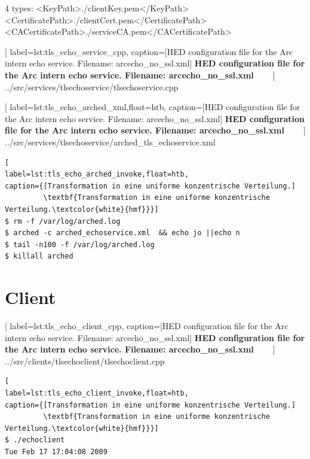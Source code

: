 4 types:
                <KeyPath>./clientKey.pem</KeyPath>
                <CertificatePath>./clientCert.pem</CertificatePath>
                <CACertificatePath>./serviceCA.pem</CACertificatePath>


	[
	label=lst:tls_echo_service_cpp,
	caption={[HED configuration file for the Arc intern echo service. Filename: arcecho\_no\_ssl.xml]
	\textbf{HED configuration file for the Arc intern echo service. Filename: arcecho\_no\_ssl.xml\textcolor{white}{hmf}}}
	]
{../src/services/tlsechoservice/tlsechoservice.cpp}





	[
	label=lst:tls_echo_arched_xml,float=htb,
	caption={[HED configuration file for the Arc intern echo service. Filename: arcecho\_no\_ssl.xml]
	\textbf{HED configuration file for the Arc intern echo service. Filename: arcecho\_no\_ssl.xml\textcolor{white}{hmf}}}
	]
{../src/services/tlsechoservice/arched_tls_echoservice.xml}


\begin{lstlisting}[
label=lst:tls_echo_arched_invoke,float=htb,
caption={[Transformation in eine uniforme konzentrische Verteilung.]
         \textbf{Transformation in eine uniforme konzentrische Verteilung.\textcolor{white}{hmf}}}]
$ rm -f /var/log/arched.log
$ arched -c arched_echoservice.xml  && echo jo ||echo n
$ tail -n100 -f /var/log/arched.log
$ killall arched
\end{lstlisting}




\clearpage
\section{Client}


	[
	label=lst:tls_echo_client_cpp,
	caption={[HED configuration file for the Arc intern echo service. Filename: arcecho\_no\_ssl.xml]
	\textbf{HED configuration file for the Arc intern echo service. Filename: arcecho\_no\_ssl.xml\textcolor{white}{hmf}}}
	]
{../src/clients/tlsechoclient/tlsechoclient.cpp}







\begin{lstlisting}[
label=lst:tls_echo_client_invoke,float=htb,
caption={[Transformation in eine uniforme konzentrische Verteilung.]
         \textbf{Transformation in eine uniforme konzentrische Verteilung.\textcolor{white}{hmf}}}]
$ ./echoclient
Tue Feb 17 17:04:08 2009
\end{lstlisting}






